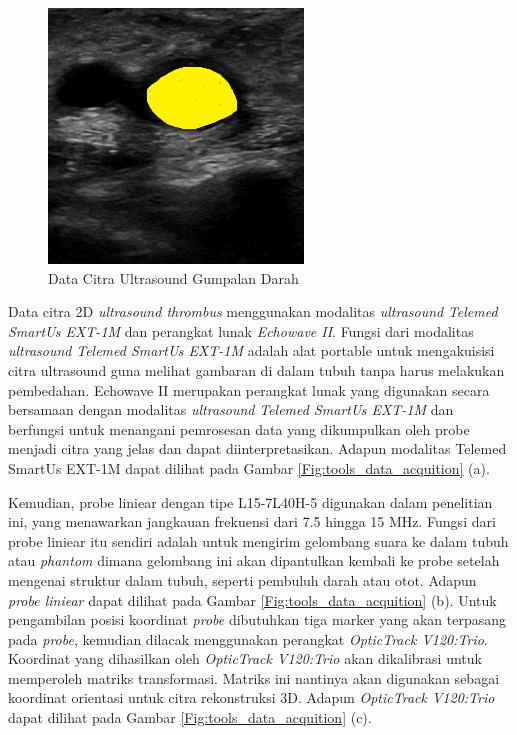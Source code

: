 \begin{figure}[H]
	\centering
	\includegraphics[scale= 0.7]{bab3/thrombus.png}
	\caption{Data Citra Ultrasound Gumpalan Darah}
	\label{fig:gumpalandarah}
\end{figure}

Data citra 2D \textit{ultrasound thrombus} menggunakan modalitas \textit{ultrasound} \textit{Telemed SmartUs EXT-1M} dan perangkat lunak \textit{Echowave II}. Fungsi dari modalitas \textit{ultrasound} \textit{Telemed SmartUs EXT-1M} adalah alat portable untuk mengakuisisi citra ultrasound guna melihat gambaran di dalam tubuh tanpa harus melakukan pembedahan. Echowave II merupakan perangkat lunak yang digunakan secara bersamaan dengan modalitas \textit{ultrasound} \textit{Telemed SmartUs EXT-1M} dan berfungsi untuk menangani pemrosesan data yang dikumpulkan oleh probe menjadi citra yang jelas dan dapat diinterpretasikan. Adapun modalitas Telemed SmartUs EXT-1M dapat dilihat pada Gambar \ref{Fig:tools_data_acquition} (a).

Kemudian, probe liniear dengan tipe L15-7L40H-5 digunakan dalam penelitian ini, yang menawarkan jangkauan frekuensi dari 7.5 hingga 15 MHz. Fungsi dari probe liniear itu sendiri adalah untuk mengirim gelombang suara ke dalam tubuh atau \textit{phantom} dimana gelombang ini akan dipantulkan kembali ke probe setelah mengenai struktur dalam tubuh, seperti pembuluh darah atau otot. Adapun \textit{probe liniear} dapat dilihat pada Gambar \ref{Fig:tools_data_acquition} (b). Untuk pengambilan posisi koordinat \textit{probe} dibutuhkan tiga marker yang akan terpasang pada \textit{probe}, kemudian dilacak menggunakan perangkat \textit{OpticTrack V120:Trio}. Koordinat yang dihasilkan oleh \textit{OpticTrack V120:Trio} akan dikalibrasi untuk memperoleh matriks transformasi. Matriks ini nantinya akan digunakan sebagai koordinat orientasi untuk citra rekonstruksi 3D. Adapun \textit{OpticTrack V120:Trio} dapat dilihat pada Gambar \ref{Fig:tools_data_acquition} (c). 

